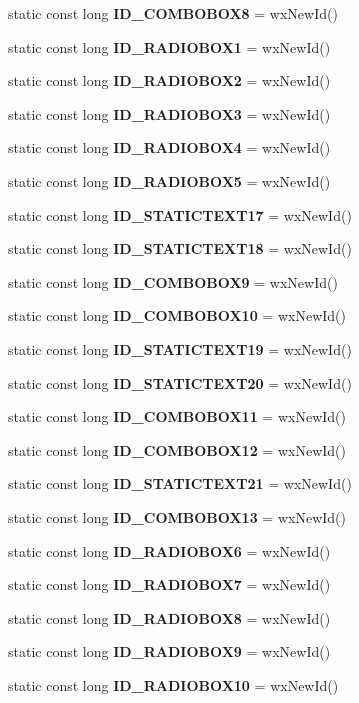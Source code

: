 \begin{DoxyCompactItemize}
\item 
static const long {\bf I\+D\+\_\+\+C\+O\+M\+B\+O\+B\+O\+X8} = wx\+New\+Id()
\item 
static const long {\bf I\+D\+\_\+\+R\+A\+D\+I\+O\+B\+O\+X1} = wx\+New\+Id()
\item 
static const long {\bf I\+D\+\_\+\+R\+A\+D\+I\+O\+B\+O\+X2} = wx\+New\+Id()
\item 
static const long {\bf I\+D\+\_\+\+R\+A\+D\+I\+O\+B\+O\+X3} = wx\+New\+Id()
\item 
static const long {\bf I\+D\+\_\+\+R\+A\+D\+I\+O\+B\+O\+X4} = wx\+New\+Id()
\item 
static const long {\bf I\+D\+\_\+\+R\+A\+D\+I\+O\+B\+O\+X5} = wx\+New\+Id()
\item 
static const long {\bf I\+D\+\_\+\+S\+T\+A\+T\+I\+C\+T\+E\+X\+T17} = wx\+New\+Id()
\item 
static const long {\bf I\+D\+\_\+\+S\+T\+A\+T\+I\+C\+T\+E\+X\+T18} = wx\+New\+Id()
\item 
static const long {\bf I\+D\+\_\+\+C\+O\+M\+B\+O\+B\+O\+X9} = wx\+New\+Id()
\item 
static const long {\bf I\+D\+\_\+\+C\+O\+M\+B\+O\+B\+O\+X10} = wx\+New\+Id()
\item 
static const long {\bf I\+D\+\_\+\+S\+T\+A\+T\+I\+C\+T\+E\+X\+T19} = wx\+New\+Id()
\item 
static const long {\bf I\+D\+\_\+\+S\+T\+A\+T\+I\+C\+T\+E\+X\+T20} = wx\+New\+Id()
\item 
static const long {\bf I\+D\+\_\+\+C\+O\+M\+B\+O\+B\+O\+X11} = wx\+New\+Id()
\item 
static const long {\bf I\+D\+\_\+\+C\+O\+M\+B\+O\+B\+O\+X12} = wx\+New\+Id()
\item 
static const long {\bf I\+D\+\_\+\+S\+T\+A\+T\+I\+C\+T\+E\+X\+T21} = wx\+New\+Id()
\item 
static const long {\bf I\+D\+\_\+\+C\+O\+M\+B\+O\+B\+O\+X13} = wx\+New\+Id()
\item 
static const long {\bf I\+D\+\_\+\+R\+A\+D\+I\+O\+B\+O\+X6} = wx\+New\+Id()
\item 
static const long {\bf I\+D\+\_\+\+R\+A\+D\+I\+O\+B\+O\+X7} = wx\+New\+Id()
\item 
static const long {\bf I\+D\+\_\+\+R\+A\+D\+I\+O\+B\+O\+X8} = wx\+New\+Id()
\item 
static const long {\bf I\+D\+\_\+\+R\+A\+D\+I\+O\+B\+O\+X9} = wx\+New\+Id()
\item 
static const long {\bf I\+D\+\_\+\+R\+A\+D\+I\+O\+B\+O\+X10} = wx\+New\+Id()

\end{DoxyCompactItemize}
